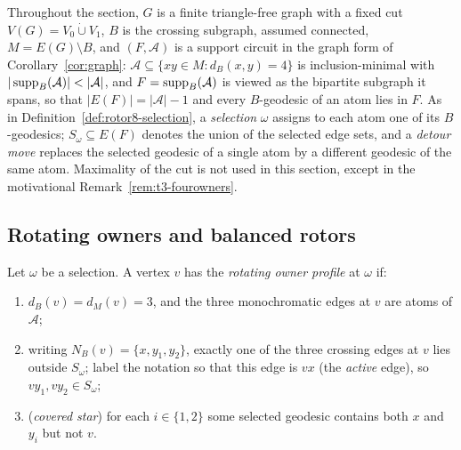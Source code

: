 Throughout the section, \(G\) is a finite triangle-free graph with a
fixed cut \(V(G)=V_0\mathbin{\dot\cup}V_1\), \(B\) is the crossing
subgraph, assumed connected, \(M=E(G)\setminus B\), and
\((F,\mathcal A)\) is a support circuit in the graph form of
Corollary~\ref{cor:graph}: \(\mathcal A\subseteq\{xy\in
M:d_B(x,y)=4\}\) is inclusion-minimal with
\(|\supp_B(\mathcal A)|<|\mathcal A|\), and
\(F=\operatorname{supp}_B(\mathcal A)\) is viewed as the bipartite subgraph it spans,
so that \(|E(F)|=|\mathcal A|-1\) and every \(B\)-geodesic of an atom
lies in \(F\). As in Definition~\ref{def:rotor8-selection}, a
\emph{selection} \(\omega\) assigns to each atom one of its
\(B\)-geodesics; \(S_\omega\subseteq E(F)\) denotes the union of the
selected edge sets, and a \emph{detour move} replaces the selected
geodesic of a single atom by a different geodesic of the same atom.
Maximality of the cut is not used in this section, except in the
motivational Remark~\ref{rem:t3-fourowners}.

\subsection{Rotating owners and balanced rotors}

\begin{definition}\label{def:t3-profile}
Let \(\omega\) be a selection. A vertex \(v\) has the \emph{rotating
owner profile} at \(\omega\) if:
\begin{enumerate}[label=\textup{(P\arabic*)}]
\item \(d_B(v)=d_M(v)=3\), and the three monochromatic edges at \(v\)
are atoms of \(\mathcal A\);
\item writing \(N_B(v)=\{x,y_1,y_2\}\), exactly one of the three
crossing edges at \(v\) lies outside \(S_\omega\); label the notation
so that this edge is \(vx\) (the \emph{active} edge), so
\(vy_1,vy_2\in S_\omega\);
\item (\emph{covered star}) for each \(i\in\{1,2\}\) some selected
geodesic contains both \(x\) and \(y_i\) but not \(v\).
\end{enumerate}
\end{definition}

